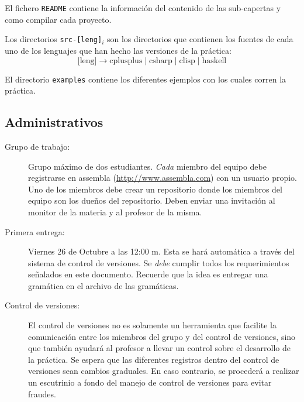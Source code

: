 \documentclass{article}
\theoremstyle{definition}
\begin{document}
\begin{description}
  El fichero \texttt{README} contiene la información del contenido de
  las sub-capertas y como compilar cada proyecto.

  Los directorios \texttt{src-[leng]$_i$} son los directorios que
  contienen los fuentes de cada uno de los lenguajes que han hecho las
  versiones de la práctica:
  \begin{equation*}
    \text{[leng]} \to \text{cplusplus} \mid \text{csharp} \mid \text{clisp} \mid \text{haskell}
  \end{equation*}

  El directorio \texttt{examples} contiene los diferentes ejemplos con
  los cuales corren la práctica.

\end{description}

\subsection{Administrativos}
\label{sec:admin}

\begin{description}
\item[Grupo de trabajo:] Grupo máximo de dos estudiantes. \emph{Cada}
  miembro del equipo debe registrarse en assembla
  (\url{http://www.assembla.com}) con un usuario propio. Uno de los
  miembros debe crear un repositorio donde los miembros del equipo son
  los dueños del repositorio. Deben enviar una invitación al monitor
  de la materia y al profesor de la misma.

\item[Primera entrega:] Viernes 26 de Octubre a las 12:00 m. Esta se
  hará automática a través del sistema de control de versiones. Se
  \emph{debe} cumplir todos los requerimientos señalados en este
  documento. Recuerde que la idea es entregar una gramática en el
  archivo de las gramáticas.

\item[Control de versiones:] El control de versiones no es solamente
  un herramienta que facilite la comunicación entre los miembros del
  grupo y del control de versiones, sino que también ayudará al
  profesor a llevar un control sobre el desarrollo de la práctica. Se
  espera que las diferentes registros dentro del control de versiones
  sean cambios graduales. En caso contrario, se procederá a realizar
  un escutrinio a fondo del manejo de control de versiones para evitar
  fraudes.
\end{description}


\newrefcontext[sorting=nyt]
\printbibliography[heading=bibintoc]
\end{document}
